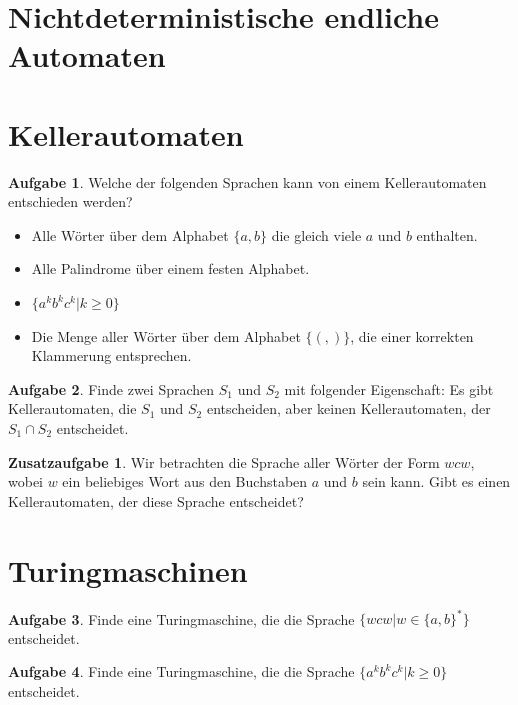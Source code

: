 \documentclass[a4paper,ngerman,12pt]{scrartcl}
\theoremstyle{definition}
\newtheorem{aufg}{Aufgabe}
\newtheorem{zaufg}{Zusatzaufgabe}
\theoremstyle{plain}
\theoremstyle{remark}
\begin{document}
\section{Nichtdeterministische endliche Automaten}


\section{Kellerautomaten}

\begin{aufg}
	Welche der folgenden Sprachen kann von einem Kellerautomaten entschieden werden?
	\begin{itemize}
		\item Alle Wörter über dem Alphabet $\{a,b\}$ die gleich viele $a$ und $b$ enthalten.
		\item Alle Palindrome über einem festen Alphabet.
		\item $\{a^kb^kc^k | k \geq 0\}$
		\item Die Menge aller Wörter über dem Alphabet $\{(,)\}$, die einer korrekten Klammerung entsprechen.
	\end{itemize}
\end{aufg}

\begin{aufg}
	Finde zwei Sprachen $S_1$ und $S_2$ mit folgender Eigenschaft: Es gibt Kellerautomaten, die $S_1$ und $S_2$ entscheiden, aber keinen Kellerautomaten, der $S_1 \cap S_2$ entscheidet.
\end{aufg}

\begin{zaufg}
	Wir betrachten die Sprache aller Wörter der Form $wcw$, wobei $w$ ein beliebiges Wort aus den Buchstaben $a$ und $b$ sein kann. Gibt es einen Kellerautomaten, der diese Sprache entscheidet?
\end{zaufg}

\section{Turingmaschinen}

\begin{aufg}
	Finde eine Turingmaschine, die die Sprache $\{wcw | w \in \{a,b\}^*\}$ entscheidet.
\end{aufg}

\begin{aufg}
	Finde eine Turingmaschine, die die Sprache $\{a^kb^kc^k | k \geq 0\}$ entscheidet.
\end{aufg}
\end{document}
